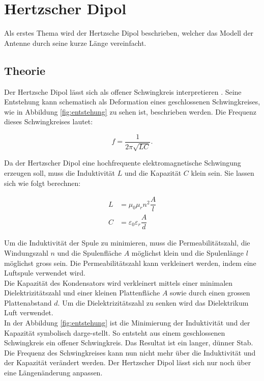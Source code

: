 \section{Hertzscher Dipol}

Als erstes Thema wird der Hertzsche Dipol beschrieben, welcher das Modell der Antenne durch seine kurze Länge vereinfacht.

\subsection{Theorie}\label{sec:HerDip}

Der Hertzsche Dipol lässt sich als offener Schwingkreis interpretieren \cite{web2}. Seine Entstehung kann schematisch als Deformation eines geschlossenen Schwingkreises, wie in Abbildung \ref{fig:entstehung} zu sehen ist, beschrieben werden. Die Frequenz dieses Schwingkreises lautet:

\begin{equation}
f = \dfrac{1}{2 \pi \sqrt{LC}}.
\end{equation} 

Da der Hertzscher Dipol eine hochfrequente elektromagnetische Schwingung erzeugen soll, muss die Induktivität $ L $ und die Kapazität $ C $ klein sein. Sie lassen sich wie folgt berechnen:

\begin{align}
L &= \mu_0  \mu_r  n^{2} \dfrac{A}{l} \\
C &= \varepsilon_0  \varepsilon_r   \dfrac{A}{d}
\label{eq:LC}
\end{align}

Um die Induktivität der Spule zu minimieren, muss die Permeabilitätszahl, die Windungszahl $ n $ und die Spulenfläche $ A $ möglichst klein und die Spulenlänge $ l $ möglichst gross sein. Die Permeabilitätszahl kann verkleinert werden, indem eine Luftspule verwendet wird.\\

Die Kapazität des Kondensators wird verkleinert mittels einer minimalen Dielektrizitätszahl und einer kleinen Plattenfläche $ A $ sowie durch einen grossen Plattenabstand $ d $. Um die Dielektrizitätszahl zu senken wird das Dielektrikum Luft verwendet.\\

In der Abbildung \ref{fig:entstehung} ist die Minimierung der Induktivität und der Kapazität symbolisch darge-stellt. So entsteht aus einem geschlossenen Schwingkreis ein offener Schwingkreis. Das Resultat ist ein langer, dünner Stab. Die Frequenz des Schwingkreises kann nun nicht mehr über die Induktivität und der Kapazität verändert werden. Der Hertzscher Dipol lässt sich nur noch über eine Längenänderung anpassen.

